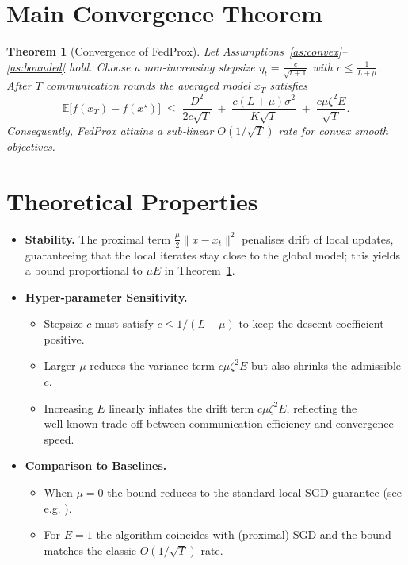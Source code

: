 \documentclass{article}
\newtheorem{theorem}{Theorem}
\newcommand{\E}{\mathbb{E}}
\begin{document}
\section*{Main Convergence Theorem}
\begin{theorem}[Convergence of FedProx]\label{thm:conv}
Let Assumptions~\ref{as:convex}–\ref{as:bounded} hold.
Choose a non‑increasing stepsize $\eta_t=\frac{c}{\sqrt{t+1}}$ with
$c\le \frac{1}{L+ \mu}$.
After $T$ communication rounds the averaged model $x_T$ satisfies
\[
    \E\!\bigl[f(x_T)-f(x^\star)\bigr]
    \;\le\;
    \frac{D^2}{2c\sqrt{T}}
    \;+\;
    \frac{c(L+\mu)\sigma^2}{K\sqrt{T}}
    \;+\;
    \frac{c\mu\zeta^2E}{\sqrt{T}} .
\]
Consequently, FedProx attains a sub‑linear $O(1/\sqrt{T})$ rate for convex smooth objectives.
\end{theorem}

\section*{Theoretical Properties}
\begin{itemize}
    \item \textbf{Stability.} The proximal term $\frac{\mu}{2}\|x-x_t\|^2$ penalises drift of local updates, guaranteeing that the local iterates stay close to the global model; this yields a bound proportional to $\mu E$ in Theorem~\ref{thm:conv}.
    \item \textbf{Hyper‑parameter Sensitivity.}
    \begin{itemize}
        \item Stepsize $c$ must satisfy $c\le 1/(L+\mu)$ to keep the descent coefficient positive.
        \item Larger $\mu$ reduces the variance term $c\mu\zeta^2E$ but also shrinks the admissible $c$.
        \item Increasing $E$ linearly inflates the drift term $c\mu\zeta^2E$, reflecting the well‑known trade‑off between communication efficiency and convergence speed.
    \end{itemize}
    \item \textbf{Comparison to Baselines.}
    \begin{itemize}
        \item When $\mu=0$ the bound reduces to the standard local SGD guarantee (see e.g. \cite{stich2019local}).
        \item For $E=1$ the algorithm coincides with (proximal) SGD and the bound matches the classic $O(1/\sqrt{T})$ rate.
    \end{itemize}
\end{itemize}
\end{document}
